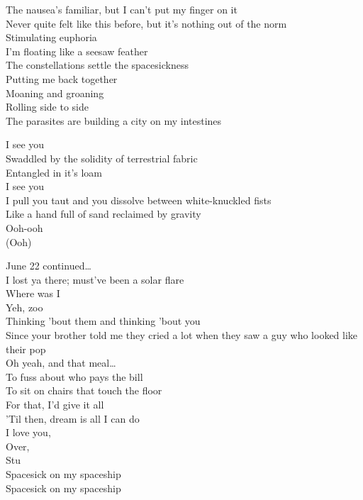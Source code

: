 The nausea's familiar, but I can't put my finger on it\\
Never quite felt like this before, but it's nothing out of the norm\\
Stimulating euphoria\\
I'm floating like a seesaw feather\\
The constellations settle the spacesickness\\
Putting me back together\\

Moaning and groaning\\
Rolling side to side\\
The parasites are building a city on my intestines\\


I see you\\
Swaddled by the solidity of terrestrial fabric\\
Entangled in it's loam\\
I see you\\
I pull you taut and you dissolve between white-knuckled fists\\
Like a hand full of sand reclaimed by gravity\\
Ooh-ooh\\
(Ooh)\\


June 22 continued…\\
I lost ya there; must've been a solar flare\\
Where was I\\
Yeh, zoo\\
Thinking 'bout them and thinking 'bout you\\
Since your brother told me they cried a lot when they saw a guy who looked like their pop\\
Oh yeah, and that meal…\\
To fuss about who pays the bill\\
To sit on chairs that touch the floor\\
For that, I'd give it all\\
'Til then, dream is all I can do\\
I love you,\\
Over,\\
Stu\\

Spacesick on my spaceship\\
Spacesick on my spaceship\\


